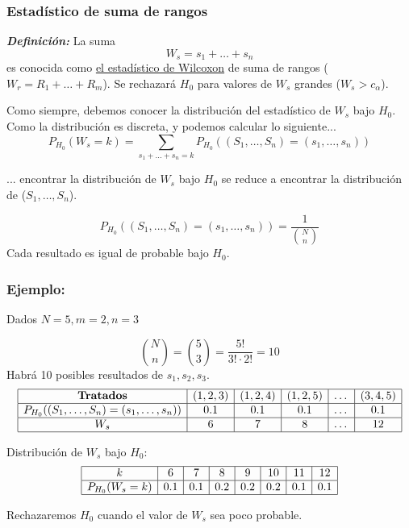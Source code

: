 \subsubsection{Estadístico de suma de rangos}
\textit{\textbf{Definición: }} La suma
\[
    W_s=s_1+\dots+s_n
\]
es conocida como \href{https://es.wikipedia.org/wiki/Prueba_de_los_rangos_con_signo_de_Wilcoxon}{el estadístico de Wilcoxon} de suma de rangos ($W_r=R_1+\dots+R_m$). Se rechazará $H_0$ para valores de $W_s$ grandes ($W_s>c_\alpha$).

Como siempre, debemos conocer la distribución del estadístico de $W_s$ bajo $H_0$. Como la distribución es discreta, y podemos calcular lo siguiente...
\[
    P_{H_0}(W_s=k)=\sum_{s_1+\dots+s_n=k} P_{H_0} ((S_1,\dots,S_n)=(s_1,\dots,s_n))
\]

... encontrar la distribución de $W_s$ bajo $H_0$ se reduce a encontrar la distribución de ($S_1,\dots,S_n$).

\[
    P_{H_0} ((S_1,\dots,S_n)=(s_1,\dots,s_n))=\frac{1}{\binom{N}{n}}
\]
Cada resultado es igual de probable bajo $H_0$.

\newpage

\subsubsection*{Ejemplo:}
\noindent Dados $N=5, m=2, n=3$

\[
    \binom{N}{n}=\binom{5}{3}=\frac{5!}{3!\cdot2!}=10
\]
Habrá 10 posibles resultados de $s_1,s_2,s_3$.
\[
    \begin{array}{|c|c|c|c|c|c|}
    \hline
    \textbf{Tratados} & (1,2,3) & (1,2,4) & (1,2,5) & \dots & (3,4,5) \\ \hline
    P_{H_0}((S_1, \dots, S_n) = (s_1, \dots, s_n)) & 0.1 & 0.1 & 0.1 & \dots & 0.1 \\ \hline
    W_s & 6 &7 &8 & \dots &12 \\ \hline
    \end{array}
\]

\noindent Distribución de \(W_s\) bajo \(H_0\):
\[
    \begin{array}{|c|c|c|c|c|c|c|c|}
    \hline
    k & 6 & 7 & 8 & 9 & 10 & 11 & 12 \\ \hline
    P_{H_0}(W_s = k) & 0.1 & 0.1 & 0.2 & 0.2 & 0.2 & 0.1 & 0.1 \\ \hline
    \end{array}
\]

\noindent Rechazaremos $H_0$ cuando el valor de $W_s$ sea poco probable.

